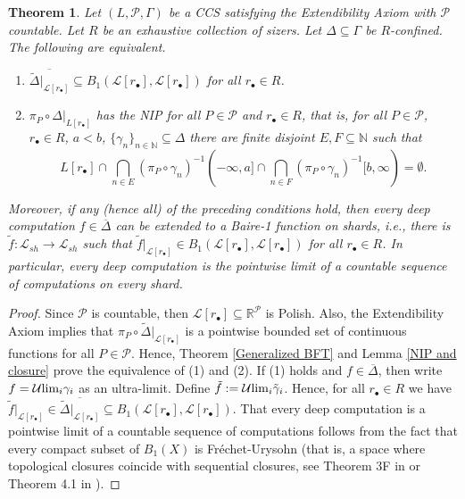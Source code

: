 \documentclass[psamsfonts]{amsart}
\newtheorem{thm}{Theorem}[section]
\theoremstyle{definition}
\theoremstyle{remark}
\numberwithin{equation}{section}
\begin{document}
\begin{thm}\label{nip-baire1def}
    Let $(L,\mathcal P,\Gamma)$ be a CCS satisfying the Extendibility Axiom with $\mathcal{P}$ countable. Let $R$ be an exhaustive collection of sizers. Let $\Delta\subseteq\Gamma$ be $R$-confined. The following are equivalent.

    \begin{enumerate}
        \item $\overline{\tilde\Delta|_{\mathcal{L}[r_\bullet]}}\subseteq B_1(\mathcal L[r_\bullet],\mathcal L[r_\bullet])$ for all $r_\bullet\in R$.
        \item $\pi_P\circ \Delta|_{L[r_\bullet]}$ has the NIP for all $P\in\mathcal{P}$ and $r_\bullet\in R$, that is, for all $P\in\mathcal P$, $r_\bullet\in R$, $a<b$, $\{\gamma_n\}_{n\in\mathbb N}\subseteq\Delta$ there are finite disjoint $E,F\subseteq\mathbb N$ such that $$L[r_\bullet]\cap\bigcap_{n\in E}(\pi_P\circ\gamma_n)^{-1}(-\infty,a]\cap\bigcap_{n\in F}(\pi_P\circ\gamma_n)^{-1}[b,\infty)=\emptyset.$$
    \end{enumerate}

    Moreover, if any (hence all) of the preceding conditions hold, then every deep computation $f\in\overline{\Delta}$ can be extended to a Baire-1 function on shards, i.e., there is $\tilde f:\mathcal L_{sh}\rightarrow \mathcal L_{sh}$ such that $\tilde f|_{\mathcal L[r_\bullet]}\in B_1(\mathcal L[r_\bullet],\mathcal L[r_\bullet])$ for all $r_{\bullet}\in R$. In particular, every deep computation is the pointwise limit of a countable sequence of computations on every shard.
\end{thm}

\begin{proof}
    Since $\mathcal{P}$ is countable, then $\mathcal{L}[r_\bullet]\subseteq\mathbb{R}^\mathcal{P}$ is Polish. Also, the Extendibility Axiom implies that $\pi_P\circ \tilde\Delta|_{\mathcal{L}[r_\bullet]}$ is a pointwise bounded set of continuous functions for all $P\in\mathcal{P}$. Hence, Theorem \ref{Generalized BFT} and Lemma \ref{NIP and closure} prove the equivalence of (1) and (2). If (1) holds and $f\in\overline{\Delta}$, then write $f=\mathcal{U}{\rm lim}_i \gamma_i$ as an ultra-limit. Define $\tilde f:=\mathcal{U}{\rm lim}_i \tilde\gamma_i$. Hence, for all $r_\bullet\in R$ we have $\tilde f|_{\mathcal{L}[r_\bullet]}\in\overline{\tilde\Delta|_{\mathcal{L}[r_\bullet]}}\subseteq B_1(\mathcal L[r_\bullet],\mathcal L[r_\bullet])$. That every deep computation is a pointwise limit of a countable sequence of computations follows from the fact that every compact subset of $B_1(X)$ is Fréchet-Urysohn (that is, a space where topological closures coincide with sequential closures, see Theorem 3F in \cite{BFT_1978_PCompactBaire} or Theorem 4.1 in \cite{debs2013rosenthal}).
\end{proof}
\end{document}
